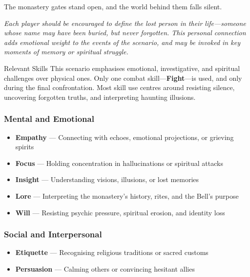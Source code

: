 \documentclass[nodeprecatedcode,bg=print]{dndbook/dndbook}
\begin{document}
The monastery gates stand open, and the world behind them falls silent.

\emph{Each player should be encouraged to define the lost person in their life—someone whose name may have been buried, but never forgotten. This personal connection adds emotional weight to the events of the scenario, and may be invoked in key moments of memory or spiritual struggle.}




\begin{WyrdSidebar}{Relevant Skills}
    This scenario emphasises emotional, investigative, and spiritual challenges over physical ones. Only one combat skill—\textbf{Fight}—is used, and only during the final confrontation. Most skill use centres around resisting silence, uncovering forgotten truths, and interpreting haunting illusions.
    
    \vspace{0.5\baselineskip}
    
    \subsubsection{Mental and Emotional}
    \begin{itemize}
        \item \textbf{Empathy} — Connecting with echoes, emotional projections, or grieving spirits
        \item \textbf{Focus} — Holding concentration in hallucinations or spiritual attacks
        \item \textbf{Insight} — Understanding visions, illusions, or lost memories
        \item \textbf{Lore} — Interpreting the monastery’s history, rites, and the Bell’s purpose
        \item \textbf{Will} — Resisting psychic pressure, spiritual erosion, and identity loss
    \end{itemize}
    
    \subsubsection{Social and Interpersonal}
    \begin{itemize}
        \item \textbf{Etiquette} — Recognising religious traditions or sacred customs
        \item \textbf{Persuasion} — Calming others or convincing hesitant allies
    \end{itemize}
    

\end{WyrdSidebar}
\end{document}

